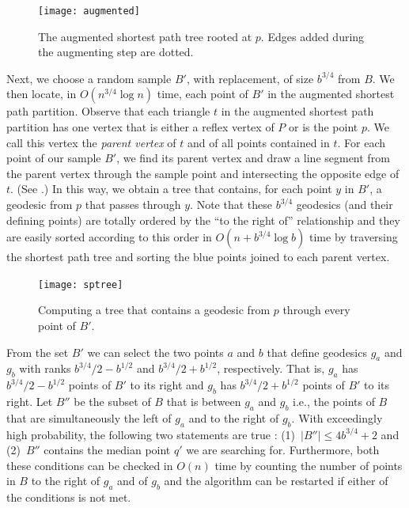 \documentclass[charterfonts,lotsofwhite]{patmorin}
\begin{document}
\begin{figure}[htbp]
\begin{center}\texttt{[image: augmented]}\end{center}
\caption{The augmented shortest path tree rooted at $p$. Edges added
during the augmenting step are dotted.}
\end{figure}

Next, we choose a random sample $B'$, with replacement, of size
$b^{3/4}$ from $B$.  We then locate, in $O(n^{3/4}\log n)$ time, each
point of $B'$ in the augmented shortest path partition. Observe that
each triangle $t$ in the augmented shortest path partition has one
vertex that is either a reflex vertex of $P$ or is the point $p$.  We
call this vertex the \emph{parent vertex} of $t$ and of all points
contained in $t$.  For each point of our sample $B'$, we find its
parent vertex and draw a line segment from the parent vertex through
the sample point and intersecting the opposite edge of $t$.  (See
.) In this way, we obtain a tree that
contains, for each point $y$ in $B'$, a geodesic from $p$ that passes
through $y$.  Note that these $b^{3/4}$ geodesics (and their defining
points) are totally ordered by the ``to the right of'' relationship and
they are easily sorted according to this order in $O(n+b^{3/4}\log b)$
time by traversing the shortest path tree and sorting the blue points
joined to each parent vertex.

\begin{figure}[htbp]
\begin{center}\texttt{[image: sptree]}\end{center}
\caption{Computing a tree that contains a geodesic from $p$ through
every point of $B'$.}
\end{figure}

From the set $B'$ we can select the two points $a$ and $b$ that define
geodesics $g_a$ and $g_b$ with ranks $b^{3/4}/2-b^{1/2}$ and
$b^{3/4}/2+b^{1/2}$, respectively.  That is, $g_a$ has
$b^{3/4}/2-b^{1/2}$ points of $B'$ to its right and $g_b$ has
$b^{3/4}/2+b^{1/2}$ points of $B'$ to its right.  Let $B''$ be the
subset of $B$ that is between $g_a$ and $g_b$ i.e., the points of $B$
that are simultaneously the left of $g_a$ and to the right of $g_b$.
With exceedingly high probability, the following two statements are
true \cite{mr95}:  (1)~$|B''|\le 4b^{3/4}+2$ and (2)~$B''$ contains
the median point $q'$ we are searching for.  Furthermore, both these
conditions can be checked in $O(n)$ time by counting the number of
points in $B$ to the right of $g_a$ and of $g_b$ and the algorithm can
be restarted if either of the conditions is not met.
\end{document}
